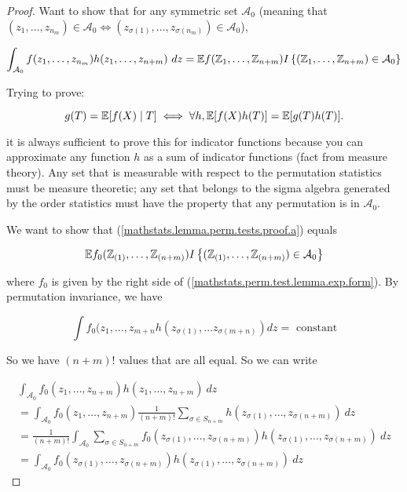 \begin{proof}

Want to show that for any symmetric set \(\mathcal{A}_0\) (meaning that \((z_1, \ldots, z_{n_m}) \in \mathcal{A}_0 \iff (z_{\sigma(1)}, \ldots, z_{\sigma(n_m)}) \in \mathcal{A}_0\)), 

\begin{equation}\label{mathstats.lemma.perm.tests.proof.a}
\int_{\mathcal{A}_0} f(z_1, \ldots, z_{n_m}) h(z_1, \ldots, z_{n+m}) \ dz = \E f(\mathbb{Z}_1, \ldots, \mathbb{Z}_{n+m}) I \left\{ ( \mathbb{Z}_1, \ldots, \mathbb{Z}_{n+m}) \in \mathcal{A}_0 \right\}
\end{equation}

Trying to prove:

\[
g(T) = \E[ f(X) \mid T] \iff \forall h, \E[f(X) h(T)] = \E[g(T) h(T)]. 
\]

it is always sufficient to prove this for indicator functions because you can approximate any function \(h\) as a sum of indicator functions (fact from measure theory). Any set that is measurable with respect to the permutation statistics must be measure theoretic; any set that belongs to the sigma algebra generated by the order statistics must have the property that any permutation is in \(\mathcal{A}_0\). 

We want to show that (\ref{mathstats.lemma.perm.tests.proof.a}) equals 

\[
 \E f_0(\mathbb{Z}_{(1)}, \ldots, \mathbb{Z}_{(n+m)}) I \left\{ ( \mathbb{Z}_{(1)}, \ldots, \mathbb{Z}_{(n+m)}) \in \mathcal{A}_0 \right\}
\]

where \(f_0\) is given by the right side of (\ref{mathstats.perm.test.lemma.exp.form}). By permutation invariance, we have 

\[
\int f_0(z_1, \ldots, z_{m+n} h(z_{\sigma(1)}, \ldots z_{\sigma(m+n)}) dz = \text{ constant}
\]

So we have \((n+m)!\) values that are all equal. So we can write

\begin{multline*}
\int_{\mathcal{A}_0} f_0(z_1, \ldots, z_{n+m}) h(z_1, \ldots, z_{n+m}) \ dz
\\  = \int_{\mathcal{A}_0} f_0(z_1, \ldots, z_{n+m}) \frac{1}{(n+m)!} \sum_{\sigma \in S_{n+m}}  h(z_{\sigma(1)}, \ldots, z_{\sigma(n+m)}) \ dz 
\\ =  \frac{1}{(n+m)!}    \int_{\mathcal{A}_0} \sum_{\sigma \in S_{n+m}} f_0(z_{\sigma(1)}, \ldots, z_{\sigma(n+m)}) h(z_{\sigma(1)}, \ldots, z_{\sigma(n+m)}) \ dz 
\\ =     \int_{\mathcal{A}_0} f_0(z_{\sigma(1)}, \ldots, z_{\sigma(n+m)}) h(z_{\sigma(1)}, \ldots, z_{\sigma(n+m)}) \ dz 
\end{multline*}


\end{proof}

